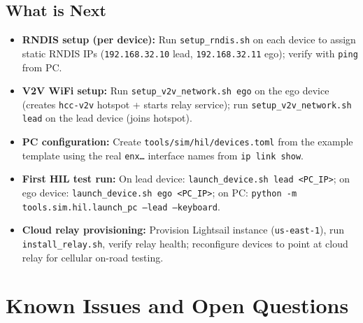\documentclass[12pt]{article}
\begin{document}
\subsection{What is Next}
\begin{itemize}
  \item \textbf{RNDIS setup (per device):} Run \texttt{setup\_rndis.sh} on each device to assign static RNDIS IPs (\texttt{192.168.32.10} lead, \texttt{192.168.32.11} ego); verify with \texttt{ping} from PC.
  \item \textbf{V2V WiFi setup:} Run \texttt{setup\_v2v\_network.sh ego} on the ego device (creates \texttt{hcc-v2v} hotspot + starts relay service); run \texttt{setup\_v2v\_network.sh lead} on the lead device (joins hotspot).
  \item \textbf{PC configuration:} Create \texttt{tools/sim/hil/devices.toml} from the example template using the real \texttt{enx\ldots} interface names from \texttt{ip link show}.
  \item \textbf{First HIL test run:} On lead device: \texttt{launch\_device.sh lead <PC\_IP>}; on ego device: \texttt{launch\_device.sh ego <PC\_IP>}; on PC: \texttt{python -m tools.sim.hil.launch\_pc --lead --keyboard}.
  \item \textbf{Cloud relay provisioning:} Provision Lightsail instance (\texttt{us-east-1}), run \texttt{install\_relay.sh}, verify relay health; reconfigure devices to point at cloud relay for cellular on-road testing.
\end{itemize}


\section{Known Issues and Open Questions}
\end{document}
